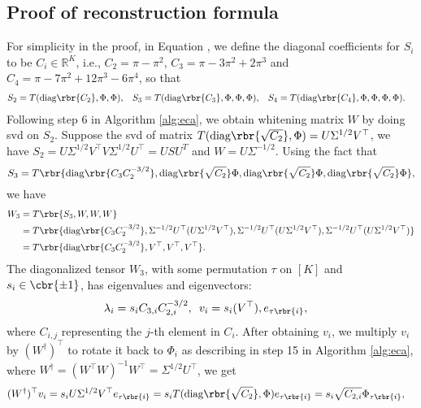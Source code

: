 \documentclass[twoside,11pt]{article}
\begin{document}
{\subsection{ Proof of reconstruction formula}

\label{sec:eigenvalue}
 For simplicity in the proof, in Equation   , we define the diagonal coefficients for $S_i$ to be $C_i \in \mathbb{R}^K$, i.e., $C_2 = \pi -\pi^2$, $C_3 = \pi -3\pi^2+ 2\pi^3$ and $C_4 = \pi - 7\pi^2 +12 \pi^3 -6 \pi^4$, so that 
  \begin{align*}
    S_2 &= T(\mathrm{diag} \rbr{C_2}, \Phi, \Phi), \; \;\; 
    S_3 =T(\mathrm{diag} \rbr{C_3}, \Phi, \Phi, \Phi), \;\;\; 
    S_4 =T(\mathrm{diag} \rbr{C_4}, \Phi, \Phi, \Phi, \Phi).
  \end{align*}
Following step 6 in Algorithm \ref{alg:eca}, we obtain whitening matrix $W$ by doing svd on $S_2$. Suppose the svd of matrix $ T( \mathrm{diag} \rbr{\sqrt{C_2}},\Phi) = U\Sigma^{1/2}V^\top$,  we have $S_2 = U\Sigma^{1/2}V^\top V\Sigma^{1/2}U^\top = USU^T$ and $W = U\Sigma^{-1/2}$. Using the fact that $$S_3 = T\rbr{\mathrm{diag} \rbr{C_3C_2^{-3/2}}, \mathrm{diag} \rbr{ \sqrt{C_2}}\Phi,\mathrm{diag}  \rbr{ \sqrt{C_2}} \Phi,\mathrm{diag}  \rbr{ \sqrt{C_2}}\Phi},$$ we have
  \begin{align}
    W_3 &=T \rbr{S_3, W,W,W} \nonumber \\
    &= T\rbr{\mathrm{diag} \rbr{C_3C_2^{-3/2}}, \Sigma^{-1/2}U^\top( U\Sigma^{1/2}V^\top),\Sigma^{-1/2}U^\top( U\Sigma^{1/2}V^\top),\Sigma^{-1/2}U^\top( U\Sigma^{1/2}V^\top)} \nonumber\\
    & = T\rbr{\mathrm{diag} \rbr{C_3C_2^{-3/2}}, V^\top,V^\top,V^\top}.
  \end{align}
The diagonalized tensor $W_3$, with some permutation $\tau$ on $[K]$ and $s_i \in \cbr{\pm 1}$, has eigenvalues and eigenvectors:
  \begin{align}
    \label{eq:lambda-s3}
    \lambda_i &= s_i C_{3,i}C_{2,i}^{-3/2}, \,\,\, v_i = s_i (V^\top), e_{\tau \rbr{i}},
  \end{align}
 where $C_{i,j}$ representing the $j$-th element in $C_i$.
After obtaining $v_i$, we multiply $v_i$ by $(W^{\dag})^\top$ to rotate it back to $\Phi_i$ as describing in step 15 in Algorithm \ref{alg:eca}, where $W^{\dag} = (W^\top W)^{-1}W^\top = \Sigma^{1/2}U^\top$, we get 
  \begin{align}
    \label{eq:W}
    (W^{\dag})^\top v_i &= s_i U\Sigma^{1/2}V^\top e_{\tau \rbr{i}} = s_i T( \mathrm{diag} \rbr{\sqrt{C_2}}, \Phi) e_{\tau \rbr{i}} = s_i \sqrt{C_{2,i}} \Phi_{\tau \rbr{i}},  

\end{align}}
\end{document}
